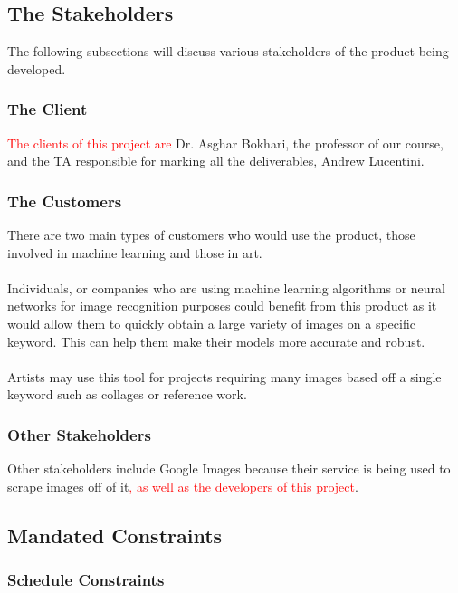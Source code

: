\documentclass[12pt, titlepage]{article}
\begin{document}
\subsection{The Stakeholders}

The following subsections will discuss various stakeholders of the product being developed.

\subsubsection{The Client}

\textcolor{red}{The clients of this project are} Dr. Asghar Bokhari, the professor of our course, and the TA responsible for marking all the deliverables, Andrew Lucentini.

\subsubsection{The Customers}

There are two main types of customers who would use the product, those involved in machine learning and those in art.
\\ \\
Individuals, or companies who are using machine learning algorithms or neural networks for image recognition purposes could benefit from this product as it would allow them to quickly obtain a large variety of images on a specific keyword. This can help them make their models more accurate and robust.
\\ \\
Artists may use this tool for projects requiring many images based off a single keyword such as collages or reference work.

\subsubsection{Other Stakeholders}

Other stakeholders include Google Images because their service is being used to scrape images off of it\textcolor{red}{, as well as the developers of this project}.

\subsection{Mandated Constraints}

\subsubsection{Schedule Constraints}
\end{document}
